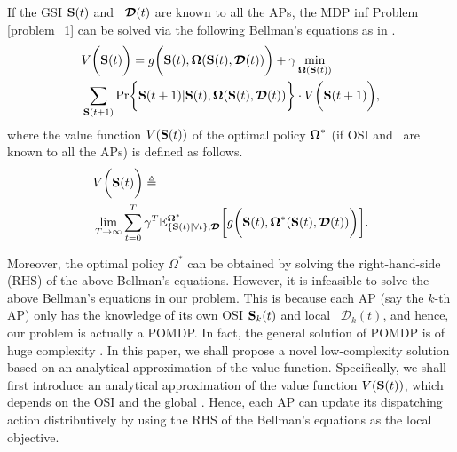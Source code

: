 If the GSI $\mathbf{S}(t)$ and \brlatency~$\boldsymbol{\mathcal{D}}(t)$ are known to all the APs, the MDP inf Problem \ref{problem_1} can be solved via the following Bellman's equations as in \cite{sutton1998}.
\begin{align}
    &V\Paren{\Stat(t)} =g\Paren{\Stat(t), \Policy(\Stat(t), \Delay(t))}
        + \gamma \min_{\Policy(\Stat(t))}
        \nonumber\\
        &\sum_{\Stat(t+1)} \Pr\Brace{ \Stat(t+1)|\Stat(t), \Policy(\Stat(t), \Delay(t)) } \cdot V\Paren{\Stat(t+1)},
    \label{eqn:sp_0}
\end{align}
where the value function $V(\mathbf{S}(t))$ of the optimal policy $\boldsymbol{\Omega}^{*}$ (if OSI and \brlatency~are known to all the APs) is defined as follows.
\begin{align}
    &V\bigg(\mathbf{S}(t)\bigg) \triangleq
    \nonumber\\
    &\lim_{T\to\infty} \sum_{t=0}^{T} \gamma^{T}
    \mathbb{E}^{\boldsymbol{\Omega}^*}_{\{\mathbf{S}(t)|\forall t\}, \boldsymbol{\mathcal{D}}} \bigg[
        g\bigg( \mathbf{S}(t), \boldsymbol{\Omega}^{*}(\mathbf{S}(t), \boldsymbol{\mathcal{D}}(t)) \bigg)
    \bigg].
    \label{eqn:val_f}
\end{align}

Moreover, the optimal policy $\Omega^{*}$ can be obtained by solving the right-hand-side (RHS) of the above Bellman's equations.
However, it is infeasible to solve the above Bellman's equations in our problem.
This is because each AP (say the $k$-th AP) only has the knowledge of its own OSI $\mathbf{S}_{k}(t)$ and local \brlatency~$\mathcal{D}_{k}(t)$, and hence, our problem is actually a POMDP.
In fact, the general solution of POMDP is of huge complexity \cite{IJCAI03-NairR,IJCAI99-BoutilierC}.
In this paper, we shall propose a novel low-complexity solution based on an analytical approximation of the value function.
Specifically, we shall first introduce an analytical approximation of the value function $V(\mathbf{S}(t))$, which depends on the OSI and the global \brlatency.
Hence, each AP can update its dispatching action distributively by using the RHS of the Bellman's equations as the local objective.
